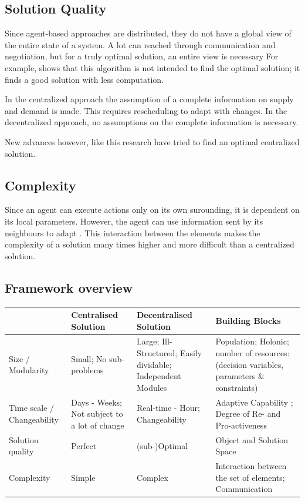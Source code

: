 \subsection{Solution Quality}
Since agent-based approaches are distributed, they do not have a global view of the entire state of a system. A lot can reached through communication and negotiation, but for a truly optimal solution, an entire view is necessary For example,  \citep{palmer2003decentralized} shows that this algorithm is not intended to find the optimal solution; it finds a good solution with less computation. 

In the centralized approach the assumption of a complete information on supply and demand is made. This requires rescheduling to adapt with changes. In the decentralized approach, no assumptions on the complete information is necessary. 

New advances however, like this research have tried to find an optimal centralized solution. 


\subsection{Complexity}
Since an agent can execute actions only on its own surounding, it is dependent on its local parameters. However, the agent can use information sent by its neighbours to adapt \citep{pujolle2006autonomic}. This interaction between the elements makes the complexity of a solution many times higher and more difficult than a centralized solution.

\subsection{Framework overview}
\begin{tabular}{p{2cm}|p{2.5cm}|p{2.5cm}|p{2.5cm}}
	& Centralised Solution & Decentralised Solution & Building Blocks\\
	\hline \hline
	Size / Modularity & Small; No sub-problems & Large; Ill-Structured; Easily dividable; Independent Modules & Population; Holonic; number of resources: (decision variables, parameters \& constraints)\\
	\hline
	Time scale / Changeability & Days - Weeks; Not subject to a lot of change & Real-time - Hour; Changeability  & Adaptive Capability ; Degree of Re- and Pro-activeness\\
	\hline
	Solution quality & Perfect & (sub-)Optimal & Object and Solution Space\\
	\hline
	Complexity & Simple & Complex & Interaction between the set of elements; Communication
\end{tabular}

